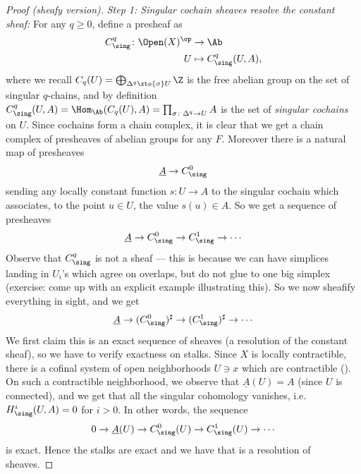 \documentclass[11pt]{amsart}
\begin{document}
\begin{proof}[Proof (sheafy version)]
\emph{Step 1: Singular cochain sheaves resolve the constant sheaf:} For any $q\ge 0$, define a presheaf as
\begin{align*}
    C^q_\sing \colon \Open(X)^\op &\to \Ab \\
    U &\mapsto C^q_\sing(U,A),
\end{align*}
where we recall $C_q(U) = \bigoplus_{\Delta^q \xto{\sigma} U}\Z$ is the free abelian group on the set of singular $q$-chains, and by definition $C^q_\sing(U,A) = \Hom_\Ab(C_q(U),A) = \prod_{\sigma \colon \Delta^q \to U}A$ is the set of \emph{singular cochains} on $U$. Since cochains form a chain complex, it is clear that we get a chain complex of presheaves of abelian groups for any $F$. Moreover there is a natural map of presheaves
\begin{align*}
    \underline{A} \to C^0_\sing
\end{align*}
sending any locally constant function $s \colon U \to A$ to the singular cochain which associates, to the point $u\in U$, the value $s(u) \in A$. So we get a sequence of presheaves
\begin{align*}
    \underline{A} \to C^0_\sing \to C^1_\sing \to \cdots
\end{align*}
Observe that $C^q_\sing$ is not a sheaf --- this is because we can have simplices landing in $U_i$'s which agree on overlaps, but do not glue to one big simplex (exercise: come up with an explicit example illustrating this). So we now sheafify everything in sight, and we get
\begin{equation}\label{eqn:singular-resolution-of-const-sheaf}
\begin{aligned}
    \underline{A} \to (C^0_\sing)^\sharp \to (C^1_\sing)^\sharp \to \cdots
\end{aligned}
\end{equation}
We first claim this is an exact sequence of sheaves (a resolution of the constant sheaf), so we have to verify exactness on stalks. Since $X$ is locally contractible, there is a cofinal system of open neighborhoods $U\ni x$ which are contractible (). On such a contractible neighborhood, we observe that $\underline{A}(U) = A$ (since $U$ is connected), and we get that all the singular cohomology vanishes, i.e. $H_\sing^i(U,A) = 0$ for $i>0$. In other words, the sequence
\begin{align*}
    0 \to \underline{A}(U) \to C^0_\sing(U) \to C^1_\sing(U) \to \cdots 
\end{align*}
is exact. Hence the stalks are exact and we have that  is a resolution of sheaves.


\end{proof}
\end{document}
